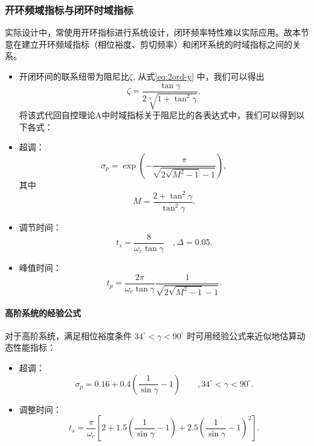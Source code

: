 \documentclass[14pt,a4paper]{article}
\theoremstyle{plain}
\theoremstyle{definition}
\theoremstyle{remark}
\theoremstyle{plain}
\theoremstyle{plain}
\theoremstyle{plain}
\theoremstyle{definition}
\theoremstyle{remark}
\numberwithin{equation}{section}
\begin{document}
			\subsubsection{开环频域指标与闭环时域指标}%
			\label{ssub:开环频域指标与闭环时域指标}
			
				实际设计中，常使用开环指标进行系统设计，闭环频率特性难以实际应用。故本节意在建立开环频域指标（相位裕度、剪切频率）和闭环系统的时域指标之间的关系。	

				\begin{itemize}
					\item 开闭环间的联系纽带为阻尼比$\zeta$, 从式\eqref{eq:2ord-y} 中，我们可以得出
						\[
						\zeta = \dfrac{\tan \gamma}{2 \sqrt[4]{1+\tan^2\gamma}} 
						,\] 
						将该式代回自控理论A中时域指标关于阻尼比的各表达式中，我们可以得到以下各式：
					\item 超调：
						\begin{equation}
						\label{eq:sp-y}
							\sigma_p = \exp\left( -\dfrac{\pi}{\sqrt{2\sqrt{M^2-1}-1}} \right) 
						,\end{equation} 
						其中
						\[
							M = \dfrac{2+\tan^2\gamma}{\tan^2\gamma}
						.\] 
					\item 调节时间：
						\begin{equation}
						\label{eq:ts-wc-y}
							t_s = \dfrac{8}{\omega_c \tan\gamma} \quad, \Delta = 0.05
						.\end{equation} 
					\item 峰值时间：
						\begin{equation}
						\label{eq:tp-wc-y}
						t_p = \dfrac{2\pi}{\omega_c \tan \gamma} \dfrac{1}{\sqrt{2\sqrt{M^2-1} -1}}
						.\end{equation} 
				\end{itemize}

			\paragraph{高阶系统的经验公式}%
			\label{par:高阶系统的经验公式}
			
				对于高阶系统，满足相位裕度条件 $34^\circ < \gamma < 90^\circ$ 时可用经验公式来近似地估算动态性能指标：
				\begin{itemize}
					\item 超调：
						\begin{equation}
						\label{eq:high-sp-y}
							\sigma_p = 0.16 + 0.4 \left( \dfrac{1}{\sin\gamma}-1 \right) \quad \quad, 34^\circ < \gamma < 90^\circ
						.\end{equation} 
					\item 调整时间：
						\begin{equation}
						\label{eq:high-ts-wc-y}
							t_s = \dfrac{\pi}{\omega_c} \left[ 2+1.5\left( \dfrac{1}{\sin\gamma}-1 \right) +2.5\left( \dfrac{1}{\sin\gamma}-1 \right)^2 \right]  
						.\end{equation} 
				\end{itemize}
\end{document}
